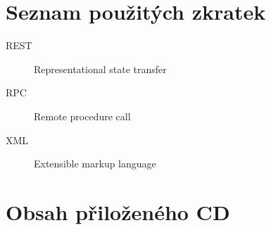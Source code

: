 \documentclass[thesis=M,czech]{FITthesis}[2019/12/23]
\begin{document}
\begin{conclusion}
\end{conclusion}




\appendix

\chapter{Seznam použitých zkratek}
\begin{description}
	\item[REST] Representational state transfer
	\item[RPC] Remote procedure call
	\item[XML] Extensible markup language
\end{description} 

\chapter{Obsah přiloženého CD}


\end{document}
